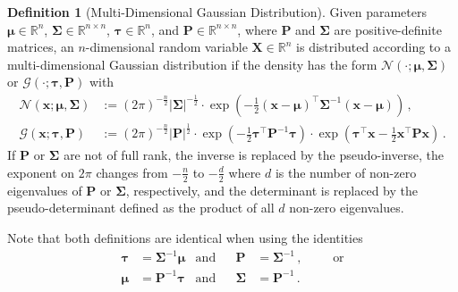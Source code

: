 \documentclass[a4paper]{article}
\newcommand{\Real}{{\mathbb R}}
\newcommand{\Normal}[3]{{\mathcal N} \left({#1};{#2},{#3}\right)}
\newcommand{\Gauss}[3]{{\mathcal G} \left({#1};{#2},{#3}\right)}
\newcommand{\bs}[1]{{\boldsymbol{#1}}}
\newcommand{\transpose}[1]{{#1}^\top}
\theoremstyle{definition}
\newtheorem{definition}{Definition}
\begin{document}
\begin{definition}[Multi-Dimensional Gaussian Distribution]
    Given parameters $\bs{\mu} \in \Real^n$, $\bs{\Sigma} \in \Real^{n \times n}$, $\bs{\tau} \in \Real^n$, and $\bs{P} \in \Real^{n \times n}$, where $\bs{P}$ and $\bs{\Sigma}$ are positive-definite matrices, an $n$-dimensional random variable $\bs{X} \in \Real^n$ is distributed according to a multi-dimensional Gaussian distribution if the density has the form $\Normal{\cdot}{\bs{\mu}}{\boldsymbol{\Sigma}}$ or $\Gauss{\cdot}{\bs{\tau}}{\bs{P}}$ with
    \begin{align}
        \Normal{\bs{x}}{\bs{\mu}}{\bs{\Sigma}} & := \left(2\pi\right)^{-\frac{n}{2}} \left|\bs{\Sigma}\right|^{-\frac{1}{2}} \cdot \exp \left( -\frac{1}{2} \transpose{(\bs{x}-\bs{\mu})} \bs{\Sigma}^{-1} (\bs{x}-\bs{\mu}) \right) \,, \label{eq:Normal_definition} \\
        \Gauss{\bs{x}}{\bs{\tau}}{\bs{P}}      & := \left(2\pi\right)^{-\frac{n}{2}} \left|\bs{P}\right|^{\frac{1}{2}} \cdot \exp \left( -\frac{1}{2} \transpose{\bs{\tau}} \bs{P}^{-1} \bs{\tau} \right) \cdot \exp \left( \transpose{\bs{\tau}} \bs{x} -\frac{1}{2} \transpose{\bs{x}} \bs{P} \bs{x} \right)\,. \label{eq:Gauss_definition}
    \end{align}
    If $\bs{P}$ or $\bs{\Sigma}$ are not of full rank, the inverse is replaced by the pseudo-inverse, the exponent on $2\pi$ changes from $-\frac{n}{2}$ to $-\frac{d}{2}$ where $d$ is the number of non-zero eigenvalues of $\bs{P}$ or $\bs{\Sigma}$, respectively, and the determinant is replaced by the pseudo-determinant defined as the product of all $d$ non-zero eigenvalues.
\end{definition}
Note that both definitions are identical when using the identities
\begin{align}
    \bs{\tau} & = \bs{\Sigma}^{-1}\bs{\mu} & \mbox{and} &  & \bs{P}      & = \bs{\Sigma}^{-1} \,,                                       &  &  & \mbox{or} \label{eq:Normal_Gauss_transformation} \\
    \bs{\mu}  & = \bs{P}^{-1}\bs{\tau}     & \mbox{and} &  & \bs{\Sigma} & = \bs{P}^{-1} \,. \label{eq:Gauss_Normal_transformation}
\end{align}
\end{document}
